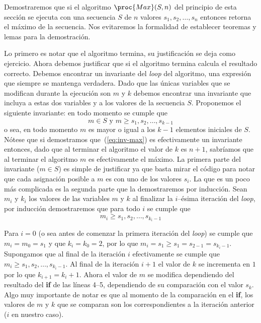 \begin{ejemplo}
Demostraremos que si el algoritmo $\proc{Max}(S,n)$ del principio de esta sección se ejecuta con una secuencia $S$ de $n$ valores $s_1,s_2,\ldots,s_n$ entonces retorna el máximo de la secuencia.
Nos evitaremos la formalidad de establecer teoremas y lemas para la demostración.

Lo primero es notar que el algoritmo termina, su justificación se deja como ejercicio.
Ahora debemos justificar que si el algoritmo termina calcula el resultado correcto.
Debemos encontrar un invariante del \emph{loop} del algoritmo, una expresión que siempre se mantenga verdadera.
Dado que las únicas variables que se modifican durante la ejecución son $m$ y $k$ debemos encontrar una invariante que incluya a estas dos variables y a los valores de la secuencia $S$.
Proponemos el siguiente invariante: en todo momento se cumple que
\begin{equation} \label{eq:inv-max}
m\in S\text{ y }m\geq s_1,s_2,\ldots,s_{k-1}
\end{equation}
o sea, en todo momento $m$ es mayor o igual a los $k-1$ elementos iniciales de $S$.
Nótese que si demostramos que~(\ref{eq:inv-max}) es efectivamente un invariante entonces, dado que al terminar el algoritmo el valor de $k$ es $n+1$, sabríamos que al terminar el algoritmo $m$ es efectivamente el máximo.
La primera parte del invariante ($m\in S$) es simple de justificar ya que basta mirar el código para notar que cada asignación posible a $m$ es con uno de los valores $s_i$.
La que es un poco más complicada es la segunda parte que la demostraremos por inducción.
Sean $m_i$ y $k_i$ los valores de las variables $m$ y $k$ al finalizar la $i$--ésima iteración del \emph{loop}, por inducción demostraremos que para todo $i$ se cumple que 
\[
m_i\geq s_1,s_2,\ldots,s_{k_i-1}
\]
\begin{inducciondemo}
  \BI Para $i=0$ (o sea antes de comenzar la primera iteración del \emph{loop}) se cumple que $m_i=m_0=s_1$ y que $k_i=k_0=2$, por lo que $m_i=s_1\geq s_1=s_{2-1}=s_{k_i-1}$.
  \HI Supongamos que al final de la iteración $i$ efectivamente se cumple que $m_i\geq s_1,s_2,\ldots,s_{k_i-1}$.
  \TI Al final de la iteración $i+1$ el valor de $k$ se incrementa en $1$ por lo que $k_{i+1}=k_i+1$.
  Ahora el valor de $m$ se modifica dependiendo del resultado del {\bf if} de las líneas 4--5, dependiendo de su comparación con el valor $s_k$.
  Algo muy importante de notar es que al momento de la comparación en el {\bf if}, los valores de $m$ y $k$ que se comparan son los correspondientes a la iteración anterior ($i$ en nuestro caso).

\end{inducciondemo}
\end{ejemplo}
